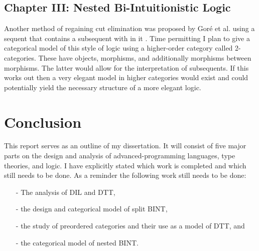 \subsection{Chapter III: Nested Bi-Intuitionistic Logic}
\label{subsec:nested_bi-intuitionistic_logic}
Another method of regaining cut elimination was proposed by Gor\'e et
al. using a sequent that contains a subsequent with in it \cite{Gore:2010}.
Time permitting I plan to give a categorical model of this style of
logic using a higher-order category called 2-categories.  These have
objects, morphisms, and additionally morphisms between morphisms.  The
latter would allow for the interpretation of subsequents. If this
works out then a very elegant model in higher categories would exist
and could potentially yield the necessary structure of a more elegant
logic.

\section{Conclusion}
\label{sec:conclusion}
This report serves as an outline of my dissertation.  It will consist
of five major parts on the design and analysis of advanced-programming
languages, type theories, and logic.  I have explicitly stated which
work is completed and which still needs to be done.  As a reminder the
following work still needs to be done:
\begin{itemize}
\item[-] The analysis of DIL and DTT,
\item[-] the design and categorical model of split BINT,
\item[-] the study of preordered categories and their use as a model of DTT, and
\item[-] the categorical model of nested BINT.
\end{itemize}

 

